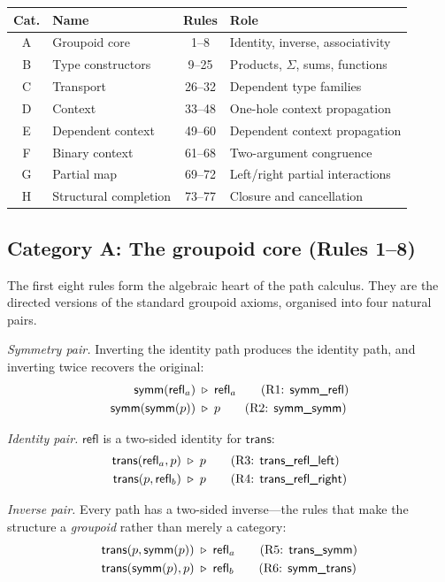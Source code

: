 \documentclass[manuscript]{BSLstyle}
\newcommand{\refl}{\mathsf{refl}}
\newcommand{\symm}{\mathsf{symm}}
\newcommand{\trans}{\mathsf{trans}}
\begin{document}
\begin{center}
\small
\begin{tabular}{clcp{5.5cm}}
\toprule
\textbf{Cat.} & \textbf{Name} & \textbf{Rules} & \textbf{Role} \\
\midrule
A & Groupoid core & 1--8 & Identity, inverse, associativity \\
B & Type constructors & 9--25 & Products, $\Sigma$, sums, functions \\
C & Transport & 26--32 & Dependent type families \\
D & Context & 33--48 & One-hole context propagation \\
E & Dependent context & 49--60 & Dependent context propagation \\
F & Binary context & 61--68 & Two-argument congruence \\
G & Partial map & 69--72 & Left/right partial interactions \\
H & Structural completion & 73--77 & Closure and cancellation \\
\bottomrule
\end{tabular}
\end{center}

\subsection{Category A: The groupoid core (Rules 1--8)}\label{ssec:cat-A}

The first eight rules form the algebraic heart of the path calculus.
They are the directed versions of the standard groupoid axioms, organised
into four natural pairs.

\emph{Symmetry pair.} Inverting the identity path produces the identity
path, and inverting twice recovers the original:
\begin{align}
\symm(\refl_a) &\;\triangleright\; \refl_a
  \tag{R1: \textsf{symm\_refl}} \\
\symm(\symm(p)) &\;\triangleright\; p
  \tag{R2: \textsf{symm\_symm}}
\end{align}

\emph{Identity pair.} $\refl$ is a two-sided identity for $\trans$:
\begin{align}
\trans(\refl_a, p) &\;\triangleright\; p
  \tag{R3: \textsf{trans\_refl\_left}} \\
\trans(p, \refl_b) &\;\triangleright\; p
  \tag{R4: \textsf{trans\_refl\_right}}
\end{align}

\emph{Inverse pair.} Every path has a two-sided inverse---the rules that
make the structure a \emph{groupoid} rather than merely a category:
\begin{align}
\trans(p, \symm(p)) &\;\triangleright\; \refl_a
  \tag{R5: \textsf{trans\_symm}} \\
\trans(\symm(p), p) &\;\triangleright\; \refl_b
  \tag{R6: \textsf{symm\_trans}}
\end{align}
\end{document}
